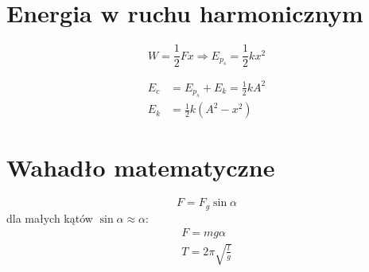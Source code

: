 \section{Energia w ruchu harmonicznym}
\begin{equation*}
  W = \frac 1 2 Fx \Rightarrow E_{p_s} = \frac 1 2 kx^2
\end{equation*}

\begin{align*}
  E_c &= E_{p_s} + E_k = \frac 1 2 kA^2\\
  E_k &= \frac 1 2 k(A^2 - x^2)
\end{align*}

\section{Wahadło matematyczne}
\begin{equation*}
  F = F_g \sin \alpha
\end{equation*}
dla małych kątów $\sin \alpha \approx \alpha$:
\begin{gather*}
  F = mg\alpha\\
  T = 2\pi\sqrt{\frac lg}
\end{gather*}
